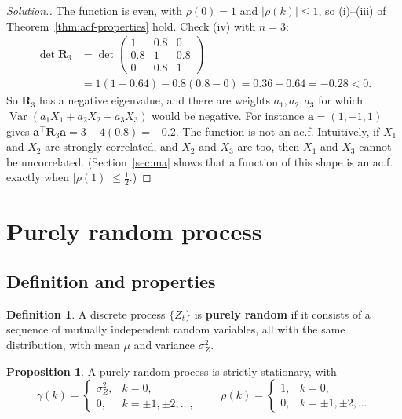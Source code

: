 \documentclass[11pt,a4paper]{article}
\theoremstyle{definition}
\newtheorem{defn}[thm]{Definition}
\newtheorem{prop}[thm]{Proposition}
\newenvironment{solution}
  {\renewcommand{\qedsymbol}{}\begin{proof}[\textit{Solution}.]}
  {\end{proof}}
\DeclareMathOperator{\Var}{Var}
\begin{document}
\begin{solution}
The function is even, with $\rho(0) = 1$ and $|\rho(k)| \le 1$, so (i)--(iii) of Theorem~\ref{thm:acf-properties} hold. Check (iv) with $n = 3$:
\begin{align*}
\det\mathbf{R}_3 &= \det\begin{pmatrix} 1 & 0.8 & 0 \\ 0.8 & 1 & 0.8 \\ 0 & 0.8 & 1 \end{pmatrix} \\
&= 1(1 - 0.64) - 0.8(0.8 - 0) = 0.36 - 0.64 = -0.28 < 0 .
\end{align*}
So $\mathbf{R}_3$ has a negative eigenvalue, and there are weights $a_1, a_2, a_3$ for which $\Var(a_1X_1 + a_2X_2 + a_3X_3)$ would be negative.
For instance $\mathbf{a} = (1, -1, 1)$ gives $\mathbf{a}^\top\mathbf{R}_3\mathbf{a} = 3 - 4(0.8) = -0.2$. The function is not an ac.f. Intuitively, if $X_1$ and $X_2$ are
strongly correlated, and $X_2$ and $X_3$ are too, then $X_1$ and $X_3$ cannot be uncorrelated. (Section~\ref{sec:ma} shows that a
function of this shape is an ac.f. exactly when $|\rho(1)| \le \frac12$.)
\end{solution}

\section{Purely random process}
\subsection{Definition and properties}
\begin{defn}
A discrete process $\{Z_t\}$ is \textbf{purely random} if it consists of a sequence of mutually independent
random variables, all with the same distribution, with mean $\mu$ and variance $\sigma_Z^2$.
\end{defn}

\begin{prop}\label{prop:white-noise}
A purely random process is strictly stationary, with
\[
\gamma(k) = \begin{cases} \sigma_Z^2 , & k = 0 , \\ 0 , & k = \pm1, \pm2, \dots , \end{cases}
\qquad
\rho(k) = \begin{cases} 1 , & k = 0 , \\ 0 , & k = \pm1, \pm2, \dots \end{cases}
\]
\end{prop}
\end{document}
